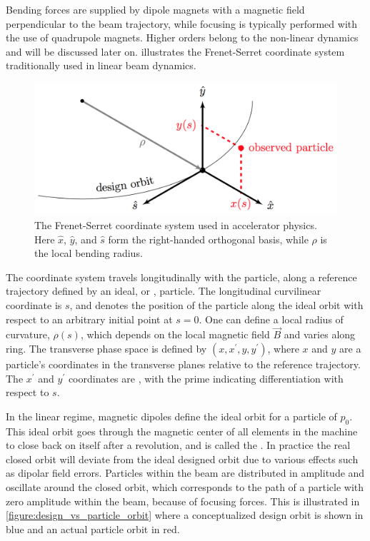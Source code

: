 Bending forces are supplied by dipole magnets with a magnetic field perpendicular to the beam trajectory, while focusing is typically performed with the use of quadrupole magnets.
Higher orders belong to the non-linear dynamics and will be discussed later on.
 illustrates the Frenet-Serret coordinate system traditionally used in linear beam dynamics.

\begin{figure}[!htb]
    \centering
    \includegraphics[width = 0.8\linewidth]{Figures/Beam_Dynamics_Theory/Frenet_Serret_Coordinate_System.png}
    \caption{The Frenet-Serret coordinate system used in accelerator physics. Here \(\hat{x}\), \(\hat{y}\), and \(\hat{s}\) form the right-handed orthogonal basis, while \(\rho\) is the local bending radius.}
    \label{figure:frenet_serret_system}
\end{figure}

The coordinate system travels longitudinally with the particle, along a reference trajectory defined by an ideal, or , particle.
The longitudinal curvilinear coordinate is \(s\), and denotes the position of the particle along the ideal orbit with respect to an arbitrary initial point at \(s = 0\).
One can define a local radius of curvature, \(\rho(s)\), which depends on the local magnetic field \(\vec{B}\) and varies along ring.
The transverse phase space is defined by \((x, x^{\prime}, y, y^{\prime})\), where \(x\) and \(y\) are a particle's coordinates in the transverse planes relative to the reference trajectory.
The \(x^{\prime}\) and \(y^{\prime}\) coordinates are , with the prime indicating differentiation with respect to \(s\).
\break

In the linear regime, magnetic dipoles define the ideal orbit for a particle of  \(p_0\).
This ideal orbit goes through the magnetic center of all elements in the machine to close back on itself after a revolution, and is called the .
In practice the real closed orbit will deviate from the ideal designed orbit due to various effects such as dipolar field errors.
Particles within the beam are distributed in amplitude and oscillate around the closed orbit, which corresponds to the path of a particle with zero amplitude within the beam, because of focusing forces. 
This is illustrated in \cref{figure:design_vs_particle_orbit} where a conceptualized design orbit is shown in blue and an actual particle orbit in red.

